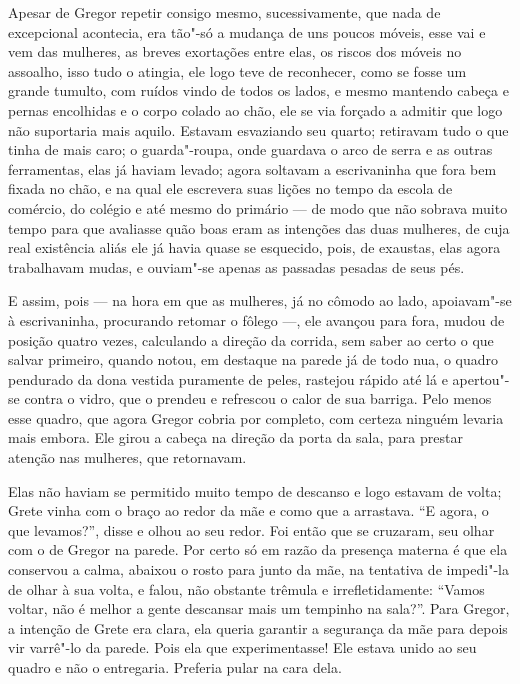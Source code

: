 Apesar de Gregor repetir consigo mesmo, sucessivamente, que nada de
excepcional acontecia, era tão"-só a mudança de uns poucos móveis, esse vai
e vem das mulheres, as breves exortações entre elas, os riscos dos móveis
no assoalho, isso tudo o atingia, ele logo teve de reconhecer, como se
fosse um grande tumulto, com ruídos vindo de todos os lados, e mesmo
mantendo cabeça e pernas encolhidas e o corpo colado ao chão, ele se via
forçado a admitir que logo não suportaria mais aquilo. Estavam esvaziando
seu quarto; retiravam tudo o que tinha de mais caro; o guarda"-roupa, onde
guardava o arco de serra e as outras ferramentas, elas já haviam levado;
agora soltavam a escrivaninha que fora bem fixada no chão, e na qual ele
escrevera suas lições no tempo da escola de comércio, do colégio e até
mesmo do primário --- de modo que não sobrava muito tempo para que avaliasse
quão boas eram as intenções das duas mulheres, de cuja real existência
aliás ele já havia quase se esquecido, pois, de exaustas, elas agora
trabalhavam mudas, e ouviam"-se apenas as passadas pesadas de seus pés.

E assim, pois --- na hora em que as mulheres, já no cômodo ao lado,
apoiavam"-se à escrivaninha, procurando retomar o fôlego ---, ele avançou
para fora, mudou de posição quatro vezes, calculando a direção da corrida,
sem saber ao certo o que salvar primeiro, quando notou, em destaque na
parede já de todo nua, o quadro pendurado da dona vestida puramente de
peles, rastejou rápido até lá e apertou"-se contra o vidro, que o prendeu e
refrescou o calor de sua barriga. Pelo menos esse quadro, que agora Gregor
cobria por completo, com certeza ninguém levaria mais embora. Ele girou a
cabeça na direção da porta da sala, para prestar atenção nas mulheres, que
retornavam.

Elas não haviam se permitido muito tempo de descanso e logo estavam de
volta; Grete vinha com o braço ao redor da mãe e como que a arrastava. “E
agora, o que levamos?”, disse e olhou ao seu redor. Foi então que se
cruzaram, seu olhar com o de Gregor na parede. Por certo só em razão da
presença materna é que ela conservou a calma, abaixou o rosto para junto
da mãe, na tentativa de impedi"-la de olhar à sua volta, e falou, não
obstante trêmula e irrefletidamente: “Vamos voltar, não é melhor a gente
descansar mais um tempinho na sala?”. Para Gregor, a intenção de Grete era
clara, ela queria garantir a segurança da mãe para depois vir varrê"-lo da
parede. Pois ela que experimentasse! Ele estava unido ao seu quadro e não
o entregaria. Preferia pular na cara dela.

